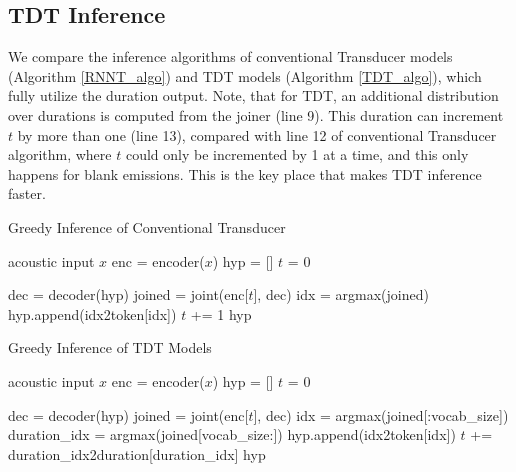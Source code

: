 \documentclass{article}
\begin{document}
\subsection{TDT Inference}
We compare the inference algorithms of conventional Transducer models (Algorithm \ref{RNNT_algo}) and TDT models (Algorithm \ref{TDT_algo}), which fully utilize the duration output.
Note, that for TDT, an additional distribution over durations is computed from the joiner (line 9).  This duration can increment $t$ by more than one (line 13), compared with line 12 of conventional Transducer algorithm, where $t$ could only be incremented by 1 at a time, and this only happens for blank emissions. This is the key place that makes TDT inference faster.
\begin{algorithm}[tb]
   \caption{Greedy Inference of Conventional Transducer}
   \label{RNNT_algo}
\begin{algorithmic}[1]
    acoustic input $x$
    \STATE enc = encoder($x$)
    \STATE hyp = []
    \STATE $t$ = 0

    \STATE dec = decoder(hyp)
    \STATE joined = joint(enc[$t$], dec)
\STATE idx = argmax(joined)
    \STATE hyp.append(idx2token[idx])
    \ELSE
    \STATE $t$ += 1 
    \ENDIF
    \ENDWHILE
     hyp 
\end{algorithmic}
\end{algorithm}

\begin{algorithm}[t]
   \caption{Greedy Inference of TDT Models}
   \label{TDT_algo}
\begin{algorithmic}[1]
    acoustic input $x$
    \STATE enc = encoder($x$)
    \STATE hyp = []
    \STATE $t$ = 0

    \STATE dec = decoder(hyp)
    \STATE joined = joint(enc[$t$], dec)
\STATE idx = argmax(joined[:vocab\_size])
    \STATE duration\_idx = argmax(joined[vocab\_size:])
    \STATE hyp.append(idx2token[idx])
    \ENDIF
    \STATE $t$ += duration\_idx2duration[duration\_idx]
    \ENDWHILE
     hyp 
\end{algorithmic}
\end{algorithm}
\end{document}
